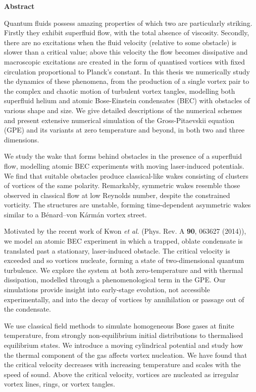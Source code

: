 \begin{center}
{\bf Abstract}
\end{center}
\noindent
Quantum fluids possess amazing properties of which two are particularly striking. Firstly they exhibit superfluid flow, with the total absence of viscosity. Secondly, there are no excitations when the fluid velocity (relative to some obstacle) is slower than a critical value; above this velocity the flow becomes dissipative and macroscopic excitations are created in the form of quantised vortices with fixed circulation proportional to Planck's constant. In this thesis we numerically study the dynamics of these phenomena, from the production of a single vortex pair to the complex and chaotic motion of turbulent vortex tangles, modelling both superfluid helium and atomic Bose-Einstein condensates (BEC) with obstacles of various shape and size. We give detailed descriptions of the numerical schemes and present extensive numerical simulation of the Gross-Pitaevskii equation (GPE) and its variants at zero temperature and beyond, in both two and three dimensions.

We study the wake that forms behind obstacles in the presence of a superfluid flow, modelling atomic BEC experiments with moving laser-induced potentials. We find that suitable obstacles produce classical-like wakes consisting of clusters of vortices of the same polarity. Remarkably, symmetric wakes resemble those observed in classical flow at low Reynolds number, despite the constrained vorticity.  The structures are unstable, forming time-dependent asymmetric wakes similar to a B\'enard--von K\'arm\'an vortex street.

Motivated by the recent work of Kwon {\it et al.} (Phys. Rev. A {\bf 90}, 063627
(2014)), we model an atomic BEC experiment in which a trapped, oblate condensate is translated past a stationary, laser-induced obstacle. The critical velocity is exceeded and so vortices nucleate, forming a state of two-dimensional quantum turbulence. We explore the system at both zero-temperature and with thermal dissipation, modelled through a phenomenological term in the GPE. Our simulations provide insight into early-stage evolution, not accessible experimentally, and into the decay of vortices by annihilation or passage out of the condensate.

We use classical field methods to simulate homogeneous Bose gases at finite temperature, from strongly non-equilibrium initial distributions to thermalised equilibrium states. We introduce a moving cylindrical potential and study how the thermal component of the gas affects vortex nucleation. We have found that the critical velocity decreases with increasing temperature and scales with the speed of sound. Above the critical velocity, vortices are nucleated as irregular vortex lines, rings, or vortex tangles.

